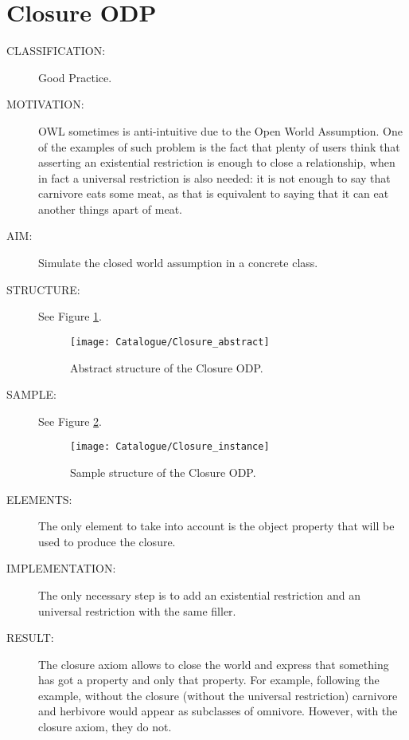  \section{Closure ODP}\begin{description}
\item [CLASSIFICATION:] Good Practice.

\item [MOTIVATION:] OWL sometimes is anti-intuitive due to the Open World Assumption. One of the examples of such problem is the fact that plenty of users think that asserting an existential restriction is enough to close a relationship, when in fact a universal restriction is also needed: it is not enough to say that carnivore eats some meat, as that is equivalent to saying that it can eat another things apart of meat.

\item [AIM:] Simulate the closed world assumption in a concrete class.

\item [STRUCTURE:] See Figure \ref{odp:Closure_abstract}.
\begin{figure}[]\centering\texttt{[image: Catalogue/Closure\_abstract]}\caption{\label{odp:Closure_abstract} Abstract structure of the Closure ODP.}\end{figure}

\item [SAMPLE:] See Figure \ref{odp:Closure_instance}.
\begin{figure}[]\centering\texttt{[image: Catalogue/Closure\_instance]}\caption{\label{odp:Closure_instance} Sample structure of the Closure ODP.}\end{figure}

\item [ELEMENTS:] The only element to take into account is the object property that will be used to produce the closure.

\item [IMPLEMENTATION:] The only necessary step is to add an existential restriction and an universal restriction with the same filler.

\item [RESULT:] The closure axiom allows to close the world and express that something has got a property and only that property. For example, following the example, without the closure (without the universal restriction) carnivore and herbivore would appear as subclasses of omnivore. However, with the closure axiom, they do not.


\end{description}
